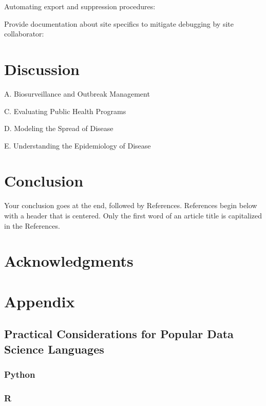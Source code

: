 \documentclass{amia}
\begin{document}
Automating export and suppression procedures:

Provide documentation about site specifics to mitigate debugging by site collaborator:



\section*{Discussion}

A. Biosurveillance and Outbreak Management 

C. Evaluating Public Health Programs 

D. Modeling the Spread of Disease 

E. Understanding the Epidemiology of Disease 

\section*{Conclusion}

Your conclusion goes at the end, followed by References.  References begin below with a header that is centered.  Only the first word of an article title is capitalized in the References.

\section*{Acknowledgments}

\makeatletter
\renewcommand{\@biblabel}[1]{\hfill #1.}
\makeatother


  

\section*{Appendix}

\subsection*{Practical Considerations for Popular Data Science Languages}

\subsubsection*{Python}

\subsubsection*{R}
\end{document}
